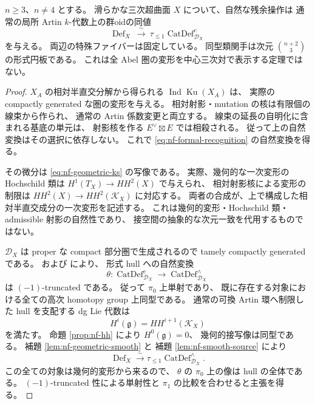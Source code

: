 \begin{theorem}
\label{thm:nf-residual-formal}
$n\geq3$、$n\neq4$ とする。
滑らかな三次超曲面 $X$ について、自然な残余操作は
通常の局所 Artin $k$-代数上の群oidの同値
\begin{equation}
\label{eq:nf-formal-recognition}
 \operatorname{Def}_X
 \ \xrightarrow{\ \sim\ }\
 \tau_{\leq1}\operatorname{CatDef}^{c}_{\mathcal D_X}
\end{equation}
を与える。
両辺の特殊ファイバーは固定している。
同型類関手は次元 $\binom{n+2}{3}$ の形式円板である。
これは全 Abel 圏の変形を中心三次対で表示する定理ではない。
\end{theorem}

\begin{proof}
$X_A$ の相対半直交分解から得られる
$\operatorname{Ind}\operatorname{Ku}(X_A)$ は、
実際の compactly generated な圏の変形を与える。
相対射影・mutation の核は有限個の線束から作られ、
通常の Artin 係数変更と両立する。
線束の延長の自明化に含まれる基底の単元は、
射影核を作る $E^\vee\boxtimes E$ では相殺される。
従って上の自然変換はその選択に依存しない。
これで \eqref{eq:nf-formal-recognition} の自然変換を得る。

その微分は \eqref{eq:nf-geometric-ks} の写像である。
実際、幾何的な一次変形の Hochschild 類は
$H^1(T_X)\to HH^2(X)$ で与えられ、
相対射影核による変形の制限は $HH^2(X)\to HH^2(\mathcal K_X)$ に対応する。
両者の合成が、上で構成した相対半直交成分の一次変形を記述する。
これは幾何的変形・Hochschild 類・admissible 射影の自然性であり、
接空間の抽象的な次元一致を代用するものではない。

$\mathcal D_X$ は proper な compact 部分圏で生成されるので
tamely compactly generated である。
\cite[Theorems~5.1.9, 5.3.16, Proposition~5.3.21]{NFDAGX}
および \cite[Sections~3.3 and~4.3]{NFBKP} により、
形式 hull への自然変換
\[
 \theta:\operatorname{CatDef}^{c}_{\mathcal D_X}
       \longrightarrow\operatorname{CatDef}^{\wedge}_{\mathcal D_X}
\]
は $(-1)$-truncated である。
従って $\pi_0$ 上単射であり、
既に存在する対象における全ての高次 homotopy group 上同型である。
通常の可換 Artin 環へ制限した hull を支配する dg Lie 代数は
\[
 H^i(\mathfrak g)=HH^{i+1}(\mathcal K_X)
\]
を満たす。
命題 \ref{prop:nf-hh} により $H^0(\mathfrak g)=0$、
幾何的接写像は同型である。
補題 \ref{lem:nf-geometric-smooth} と
補題 \ref{lem:nf-smooth-source} により
\[
 \operatorname{Def}_X
 \xrightarrow{\sim}
 \tau_{\leq1}\operatorname{CatDef}^{\wedge}_{\mathcal D_X}.
\]
この全ての対象は幾何的変形から来るので、
$\theta$ の $\pi_0$ 上の像は hull の全体である。
$(-1)$-truncated 性による単射性と
$\pi_1$ の比較を合わせると主張を得る。
\end{proof}

